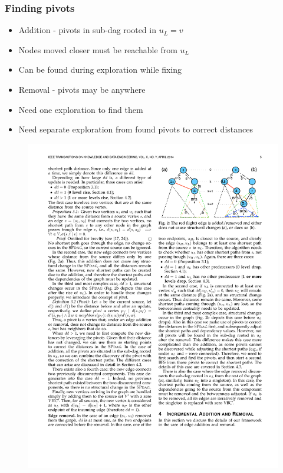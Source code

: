 \begin{frame}
  \frametitle{Finding pivots}

  \begin{itemize}
    \item Addition - pivots in sub-dag rooted in $u_L = v$
    \item Nodes moved closer must be reachable from $u_L$
    \item Can be found during exploration while fixing \paths
  \end{itemize}
  \begin{itemize}
    \item Removal - pivots may be anywhere
    \item Need one exploration to find them
    \item Need separate exploration from found pivots to correct distances
  \end{itemize}

  \begin{figure}[t]
    \centering
    \includegraphics[width=\textwidth, height=0.5\textheight, keepaspectratio]{imgs/kdb-bfs}
  \end{figure}

\end{frame}


